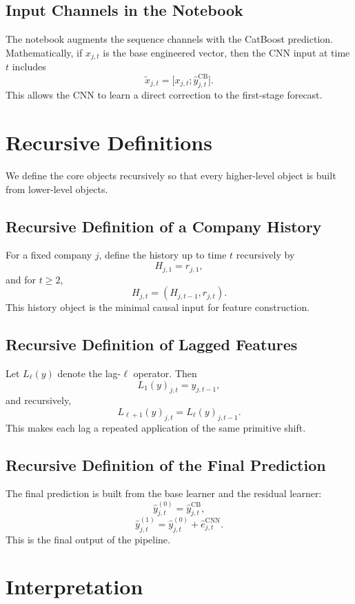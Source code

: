 \documentclass[11pt]{article}
\newcommand{\1}{\mathbf{1}}
\begin{document}
\subsection{Input Channels in the Notebook}

The notebook augments the sequence channels with the CatBoost prediction. Mathematically, if $x_{j,t}$ is the base engineered vector, then the CNN input at time $t$ includes
\[
\tilde x_{j,t} = \big[x_{j,t};\hat y^{\mathrm{CB}}_{j,t}\big].
\]
This allows the CNN to learn a direct correction to the first-stage forecast.

\section{Recursive Definitions}

We define the core objects recursively so that every higher-level object is built from lower-level objects.

\subsection{Recursive Definition of a Company History}

For a fixed company $j$, define the history up to time $t$ recursively by
\[
H_{j,1} = r_{j,1},
\]
and for $t \ge 2$,
\[
H_{j,t} = (H_{j,t-1}, r_{j,t}).
\]
This history object is the minimal causal input for feature construction.

\subsection{Recursive Definition of Lagged Features}

Let $L_\ell(y)$ denote the lag-$\ell$ operator. Then
\[
L_1(y)_{j,t} = y_{j,t-1},
\]
and recursively,
\[
L_{\ell+1}(y)_{j,t} = L_\ell(y)_{j,t-1}.
\]
This makes each lag a repeated application of the same primitive shift.

\subsection{Recursive Definition of the Final Prediction}

The final prediction is built from the base learner and the residual learner:
\[
\hat y^{(0)}_{j,t} = \hat y^{\mathrm{CB}}_{j,t},
\]
\[
\hat y^{(1)}_{j,t} = \hat y^{(0)}_{j,t} + \hat e^{\mathrm{CNN}}_{j,t}.
\]
This is the final output of the pipeline.

\section{Interpretation}
\end{document}

